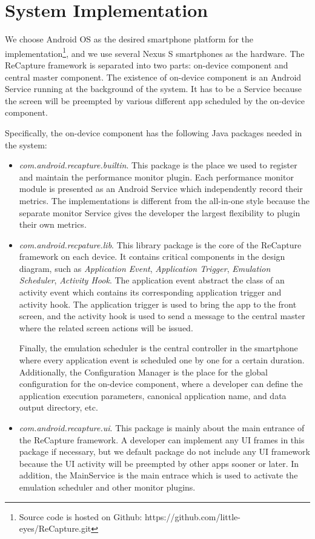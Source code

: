 \section{System Implementation} \label{sec:implementation}
We choose Android OS as the desired smartphone platform for the implementation\footnote{Source code is hosted on Github: https://github.com/little-eyes/ReCapture.git}, and we use several Nexus S smartphones as the hardware. The ReCapture framework is separated into two parts: on-device component and central master component. The existence of on-device component is an Android Service running at the background of the system. It has to be a Service because the screen will be preempted by various different app scheduled by the on-device component.

Specifically, the on-device component has the following Java packages needed in the system:
\begin{itemize}
\item \emph{com.android.recapture.builtin}. This package is the place we used to register and maintain the performance monitor plugin. Each performance monitor module is presented as an Android Service which independently record their metrics. The implementations is different from the all-in-one style because the separate monitor Service gives the developer the largest flexibility to plugin their own metrics.

\item \emph{com.android.recpature.lib}. This library package is the core of the ReCapture framework on each device. It contains critical components in the design diagram, such as \emph{Application Event}, \emph{Application Trigger}, \emph{Emulation Scheduler}, \emph{Activity Hook}. The application event abstract the class of an activity event which contains its corresponding application trigger and activity hook. The application trigger is used to bring the app to the front screen, and the activity hook is used to send a message to the central master where the related screen actions will be issued.

Finally, the emulation scheduler is the central controller in the smartphone where every application event is scheduled one by one for a certain duration. Additionally, the Configuration Manager is the place for the global configuration for the on-device component, where a developer can define the application execution parameters, canonical application name, and data output directory, etc.

\item\emph{com.android.recapture.ui}. This package is mainly about the main entrance of the ReCapture framework. A developer can implement any UI frames in this package if necessary, but we default package do not include any UI framework because the UI activity will be preempted by other apps sooner or later. In addition, the MainService is the main entrace which is used to activate the emulation scheduler and other monitor plugins.
\end{itemize}

